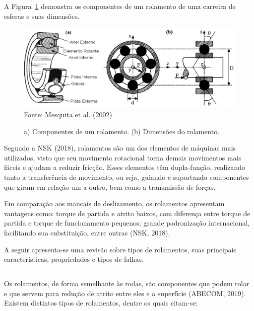 \documentclass[
	12pt,				
	oneside,			
	a4paper,			
	english,			
	brazil,	
	sumario=abnt-6027-2012		
	]{abntex2ppgsi}
\begin{document}
A Figura~\ref{ComponentesRolamentos} demonstra os componentes de um rolamento de uma carreira de esferas e suas dimensões. 

\begin{figure}[!htb]
\centering
\caption{a) Componentes de um rolamento. (b) Dimensões do rolamento.}
\includegraphics[width=\textwidth,height=\textheight,keepaspectratio]{Figura1} \\
Fonte: Mesquita et al. (2002)
\label{ComponentesRolamentos}
\end{figure}

Segundo a NSK (2018), rolamentos são um dos elementos de máquinas mais utilizados, visto que seu movimento rotacional torna demais movimentos mais fáceis e ajudam a reduzir fricção. Esses elementos têm dupla-função, realizando tanto a transferência de movimento, ou seja, guiando e suportando componentes que giram em relação um a outro, bem como a transmissão de forças.

Em comparação aos mancais de deslizamento, os rolamentos apresentam vantagens como: torque de partida e atrito baixos, com diferença entre torque de partida e torque de funcionamento pequenos; grande padronização internacional, facilitando sua substituição, entre outras (NSK, 2018).

A seguir apresenta-se uma revisão sobre tipos de rolamentos, suas principais características, propriedades e tipos de falhas.

\subsection{}

Os rolamentos, de forma semelhante às rodas, são componentes que podem rolar  e que servem para redução de atrito entre eles e a superfície (ABECOM, 2019). Existem distintos tipos de rolamentos, dentre os quais citam-se:
\end{document}
